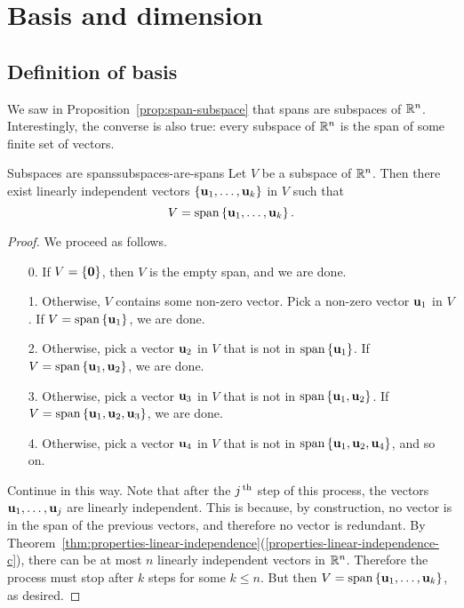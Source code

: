 \section{Basis and dimension}

\subsection{Definition of basis}

We saw in Proposition~\ref{prop:span-subspace} that spans are
subspaces of\/ $\mathbb{R}^n$. Interestingly, the converse is also true: every
subspace of\/ $\mathbb{R}^n$ is the span of some finite set of vectors.

\begin{theorem}{Subspaces are spans}{subspaces-are-spans}
  Let $V$ be a subspace of\/ $\mathbb{R}^n$. Then there exist linearly
  independent vectors $\left\{\mbox{\bf u}_{1},\ldots,\mbox{\bf u}_{k}\right\}$ in $V$
  such that
  \begin{equation*}
    V= \sspan\set{\vect{u}_{1},\ldots ,\vect{u}_{k}}. 
  \end{equation*}%
  \vspace{-3ex}
\end{theorem}

\begin{proof}
  We proceed as follows.
  \begin{enumerate}
  \item[0.] If $V=\left\{\mbox{\bf 0}\right\}$, then $V$ is the empty span, and we
    are done.
  \item[1.] Otherwise, $V$ contains some non-zero vector.  Pick a
    non-zero vector $\mbox{\bf u}_{1}$ in $V$. If
    $V=\sspan\set{\vect{u}_{1}}$, we are done.
  \item[2.] Otherwise, pick a vector $\mbox{\bf u}_{2}$ in $V$ that is not
    in $\sspan\set{\vect{u}_{1}}$. If
    $V=\sspan\set{\vect{u}_{1},\vect{u}_{2}}$, we are done.
  \item[3.] Otherwise, pick a vector $\mbox{\bf u}_{3}$ in $V$ that is not
    in $\sspan\set{\vect{u}_{1},\vect{u}_{2}}$. If
    $V=\sspan\set{\vect{u}_{1},\vect{u}_{2},\vect{u}_{3}}$, we are done.
  \item[4.] Otherwise, pick a vector $\mbox{\bf u}_{4}$ in $V$ that is not
    in $\sspan\set{\vect{u}_{1},\vect{u}_{2},\vect{u}_{4}}$, and so on.
  \end{enumerate}
  Continue in this way. Note that after the $j^{\,\rm th}$ step of this
  process, the vectors $\mbox{\bf u}_1,\ldots,\mbox{\bf u}_j$ are linearly
  independent. This is because, by construction, no vector is in the
  span of the previous vectors, and therefore no vector is redundant.
  By
  Theorem~\ref{thm:properties-linear-independence}(\ref{properties-linear-independence-c}),
  there can be at most $n$ linearly independent vectors in $\mathbb{R}^n$.
  Therefore the process must stop after $k$ steps for some $k\leq
  n$. But then $V=\sspan\set{\vect{u}_{1},\ldots ,\vect{u}_{k}}$, as
  desired.
\end{proof}

